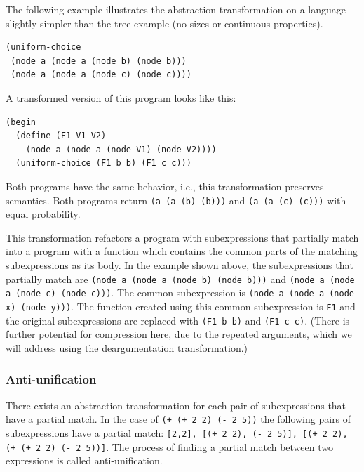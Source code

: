 \documentclass[a4paper,10pt]{article}
\begin{document}
The following example illustrates the abstraction transformation on a language slightly simpler than the tree example (no sizes or continuous properties).
\begin{lstlisting}[mathescape=true]
(uniform-choice 
 (node a (node a (node b) (node b)))
 (node a (node a (node c) (node c))))
\end{lstlisting}
A transformed version of this program looks like this:
\begin{lstlisting}[mathescape=true]
(begin
  (define (F1 V1 V2)
    (node a (node a (node V1) (node V2))))
  (uniform-choice (F1 b b) (F1 c c)))
\end{lstlisting}
Both programs have the same behavior, i.e., this transformation preserves semantics. Both programs return \texttt{(a (a (b) (b)))} and \texttt{(a (a (c) (c)))} with equal probability.

This transformation refactors a program with subexpressions that partially match into a program with a function which contains the common parts of the matching subexpressions as its body.  In the example shown above, the subexpressions that partially match are \texttt{(node a (node a (node b) (node b)))} and \texttt{(node a (node a (node c) (node c)))}.  The common subexpression is \texttt{(node a (node a (node x) (node y)))}. The function created using this common subexpression is \texttt{F1} and the original subexpressions are replaced with \texttt{(F1 b b)} and \texttt{(F1 c c)}. (There is further potential for compression here, due to the repeated arguments, which we will address using the deargumentation transformation.)

\subsubsection{Anti-unification}

There exists an abstraction transformation for each pair of subexpressions that have a partial match.  In the case of \texttt{(+ (+ 2 2) (- 2 5))} the following pairs of subexpressions have a partial match: \texttt{[2,2], [(+ 2 2), (- 2 5)], [(+ 2 2), (+ (+ 2 2) (- 2 5))]}. The process of finding a partial match between two expressions is called anti-unification.
\end{document}
